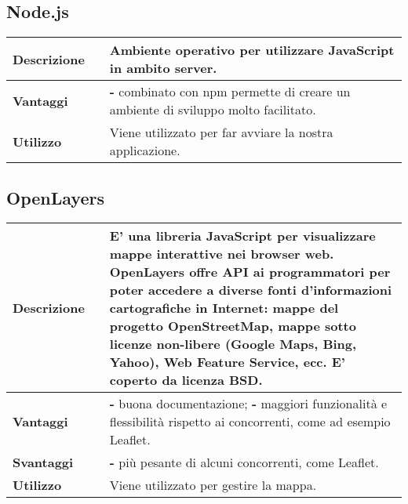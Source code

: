 \vspace{40px}
\subsection{Node.js}
\label{Node.js}
\begin{table}[H]
	\centering
	\begin{tabular}{p{2cm}p{0.5cm}p{11.5cm}}
		\arrayrulecolor{lightgray}
		\toprule
		\textbf{Descrizione} & &
		Ambiente operativo per utilizzare JavaScript in ambito server.
		\\ \midrule
		\textbf{Vantaggi} & &
		\textbf{- }combinato con npm permette di creare un ambiente di sviluppo molto facilitato.
		\\ \midrule
		\textbf{Utilizzo} & &
		Viene utilizzato per far avviare la nostra applicazione.
		\\ \bottomrule
	\end{tabular}
\end{table}

\vspace{40px}
\subsection{OpenLayers}
\label{OpenLayers}
\begin{table}[H]
	\centering
	\begin{tabular}{p{2cm}p{0.5cm}p{11.5cm}}
		\arrayrulecolor{lightgray}
		\toprule
		\textbf{Descrizione} & &
		E' una libreria JavaScript per visualizzare mappe interattive nei browser web.
		OpenLayers offre API ai programmatori per poter accedere a diverse fonti d'informazioni cartografiche in Internet: mappe del progetto OpenStreetMap, mappe sotto licenze non-libere (Google Maps, Bing, Yahoo), Web Feature Service, ecc. E' coperto da licenza BSD.
		\\ \midrule
		\textbf{Vantaggi} & &
		\textbf{- }buona documentazione;
		\newline
		\textbf{- }maggiori funzionalità e flessibilità rispetto ai concorrenti, come ad esempio Leaflet.
		\\ \midrule
		\textbf{Svantaggi} & &
		\textbf{- }più pesante di alcuni concorrenti, come Leaflet.
		\\ \midrule
		\textbf{Utilizzo} & &
		Viene utilizzato per gestire la mappa.
		\\ \bottomrule
	\end{tabular}
\end{table}




